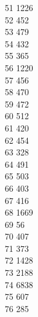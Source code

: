 { 51	1226 \\
 52	452 \\
 53	479 \\
 54	432 \\
 55	365 \\
 56	1220 \\
 57	456 \\
 58	470 \\
 59	472 \\
 60	512 \\
 61	420 \\
 62	454 \\
 63	328 \\
 64	491 \\
 65	503 \\
 66	403 \\
 67	416 \\
 68	1669 \\
 69	56 \\
 70	407 \\
 71	373 \\
 72	1428 \\
 73	2188 \\
 74	6838 \\
 75	607 \\
 76	285 \\
}
